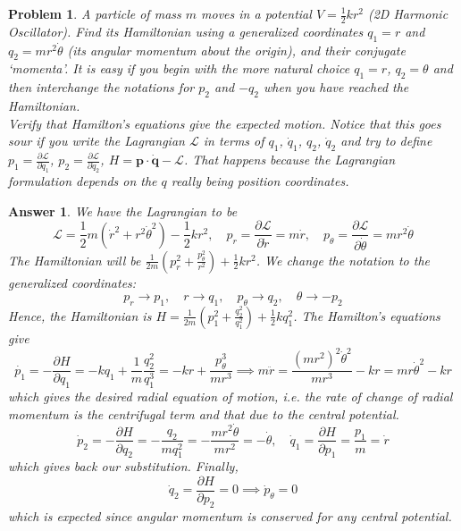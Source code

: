 \documentclass[a4paper]{article}
\newtheorem{ans}{Answer}[section]
\theoremstyle{new}
\newtheorem{qns}{Problem}[section]
\begin{document}
\newpage
\begin{qns}
A particle of mass $m$ moves in a potential $V=\frac{1}{2}kr^2$ (2D Harmonic Oscillator). Find its Hamiltonian using a generalized coordinates $q_1=r$ and $q_2=mr^2\dot{\theta}$ (its angular momentum about the origin), and their conjugate `momenta'. It is easy if you begin with the more natural choice $q_1=r$, $q_2=\theta$ and then interchange the notations for $p_2$ and $-q_2$ when you have reached the Hamiltonian.\\[5pt]
Verify that Hamilton's equations give the expected motion. Notice that this goes sour if you write the Lagrangian $\mathcal{L}$ in terms of $q_1$, $\dot{q}_1$, $q_2$, $\dot{q}_2$ and try to define $p_1=\frac{\partial\mathcal{L}}{\partial\dot{q}_1}$, $p_2=\frac{\partial\mathcal{L}}{\partial\dot{q}_2}$, $H=\mathbf{p}\cdot\mathbf{\dot{q}}-\mathcal{L}$. That happens because the Lagrangian formulation depends on the $q$ really being position coordinates.
\end{qns}
\begin{ans}
We have the Lagrangian to be
$$\mathcal{L}=\frac{1}{2}m(\dot{r}^2+r^2\dot{\theta}^2)-\frac{1}{2}kr^2,\quad p_r=\frac{\partial\mathcal{L}}{\partial\dot{r}}=m\dot{r},\quad p_\theta=\frac{\partial\mathcal{L}}{\partial\dot{\theta}}=mr^2\dot{\theta}$$
The Hamiltonian will be $\frac{1}{2m}(p_r^2+\frac{p_\theta^2}{r^2})+\frac{1}{2}kr^2$. We change the notation to the generalized coordinates:
$$p_r\rightarrow p_1,\quad r\rightarrow q_1,\quad p_\theta\rightarrow q_2,\quad\theta\rightarrow -p_2$$
Hence, the Hamiltonian is $H=\frac{1}{2m}(p_1^2+\frac{q_2^2}{q_1^2})+\frac{1}{2}kq_1^2$. The Hamilton's equations give
$$\dot{p_1}=-\frac{\partial H}{\partial q_1}=-kq_1+\frac{1}{m}\frac{q_2^2}{q_1^3}=-kr+\frac{p_\theta^3}{mr^3}\implies m\ddot{r}=\frac{(mr^2)^2\dot{\theta}^2}{mr^3}-kr=mr\dot{\theta}^2-kr$$
which gives the desired radial equation of motion, i.e. the rate of change of radial momentum is the centrifugal term and that due to the central potential.
$$\dot{p}_2=-\frac{\partial H}{\partial q_2}=-\frac{q_2}{mq_1^2}=-\frac{mr^2\dot{\theta}}{mr^2}=-\dot{\theta},\quad\dot{q}_1=\frac{\partial H}{\partial p_1}=\frac{p_1}{m}=\dot{r}$$
which gives back our substitution. Finally,
$$\dot{q}_2=\frac{\partial H}{\partial p_2}=0\implies\dot{p}_\theta=0$$
which is expected since angular momentum is conserved for any central potential.
\end{ans}
\end{document}
